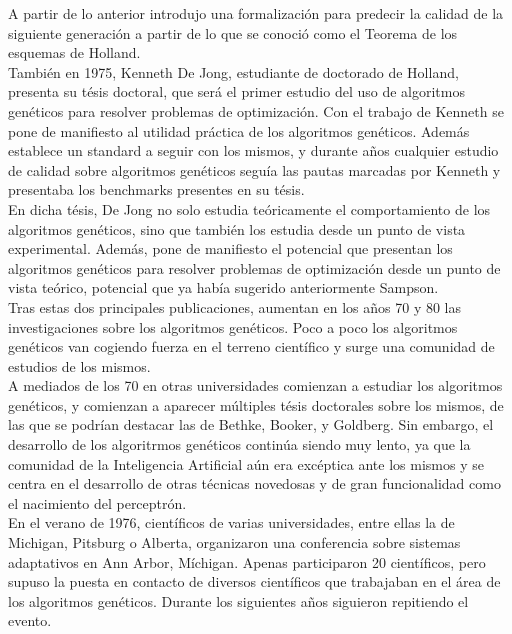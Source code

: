 \documentclass[12pt]{article} \usepackage[utf8x]{inputenc}
\begin{document}
A partir de lo anterior introdujo una formalización para predecir la calidad de 
la siguiente generación a partir de lo que se conoció como el Teorema de los 
esquemas de Holland.\\


También en 1975, Kenneth De Jong, estudiante de doctorado de Holland, presenta 
su tésis doctoral, que será el primer estudio del uso de algoritmos genéticos 
para resolver problemas de optimización. Con el trabajo de Kenneth se pone de 
manifiesto al utilidad práctica de los algoritmos genéticos. Además establece 
un standard a seguir con los mismos, y durante años cualquier estudio de calidad
sobre algoritmos genéticos seguía las pautas marcadas por Kenneth y presentaba 
los benchmarks presentes en su tésis.\\

En dicha tésis, De Jong no solo estudia teóricamente el comportamiento de los 
algoritmos genéticos, sino que también los estudia desde un punto de vista 
experimental. Además, pone de manifiesto el potencial que presentan los algoritmos 
genéticos para resolver problemas de optimización desde un punto de vista teórico, 
potencial que ya había sugerido anteriormente Sampson.\\

Tras estas dos principales publicaciones, aumentan en los años 70 y 80 las 
investigaciones sobre los algoritmos genéticos. Poco a poco los algoritmos genéticos van
cogiendo fuerza en el terreno científico y surge una 
comunidad de estudios de los mismos.\\

A mediados de los 70 en otras universidades comienzan a estudiar los algoritmos genéticos,
y comienzan a aparecer múltiples tésis doctorales sobre los mismos, de las que se podrían 
destacar las de Bethke, Booker, y Goldberg. Sin embargo, el desarrollo de los algoritrmos 
genéticos continúa siendo muy lento, ya que la comunidad de la Inteligencia Artificial
aún era excéptica ante los mismos y se centra en el desarrollo de otras técnicas novedosas 
y de gran funcionalidad como el nacimiento del perceptrón.\\

En el verano de 1976, científicos de varias universidades, entre ellas la de Michigan, 
Pitsburg o  Alberta, organizaron una conferencia sobre sistemas adaptativos en Ann Arbor, 
Míchigan. Apenas participaron 20 científicos, pero supuso la puesta en contacto de diversos 
científicos que trabajaban en el área de los algoritmos genéticos. Durante los siguientes 
años siguieron repitiendo el evento.\\
\end{document}
